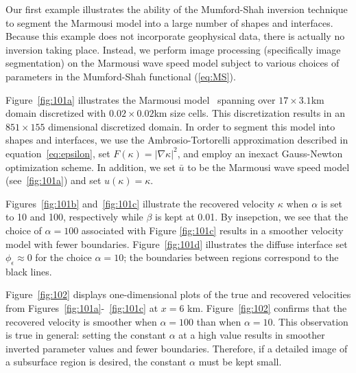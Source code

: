 \documentclass[manuscript,revised]{geophysics}
\begin{document}
Our first example illustrates the ability of the Mumford-Shah inversion technique to segment the Marmousi model into a large number of shapes and interfaces.  Because this example does not incorporate geophysical data, there is actually no inversion taking place.  Instead, we perform image processing (specifically image segmentation) on the Marmousi wave speed model subject to various choices of parameters in the Mumford-Shah functional  (\ref{eq:MS}).

Figure~\ref{fig:101a} illustrates the Marmousi model~\cite{Marmousi2} spanning over $17\times3.1$km domain discretized with $0.02\times0.02$km size cells. This discretization results in an $851\times155$ dimensional discretized domain. In order to segment this model into shapes and interfaces, we use the Ambrosio-Tortorelli approximation described in equation~\ref{eq:epsilon}, set $F(\kappa)=\left\vert \nabla \kappa \right\vert^2$, and employ an inexact Gauss-Newton optimization scheme.  In addition, we set $\bar{u}$ to be the Marmousi wave speed model (see~\ref{fig:101a}) and set $u(\kappa)=\kappa$. 

Figures~\ref{fig:101b} and~\ref{fig:101c} illustrate the recovered velocity $\kappa$ when $\alpha$ is set to 10 and 100, respectively while $\beta$ is kept at 0.01. By insepction, we see that the choice of $\alpha = 100$ associated with Figure \ref{fig:101c} results in a smoother velocity model with fewer boundaries. Figure~\ref{fig:101d} illustrates the diffuse interface set $\phi_\epsilon \approx 0$ for the choice $\alpha = 10$; the boundaries between regions correspond to the black lines.

Figure~\ref{fig:102} displays one-dimensional plots of the true and recovered velocities from Figures~\ref{fig:101a}-~\ref{fig:101c} at $x = 6$ km. Figure~\ref{fig:102} confirms that the recovered velocity is smoother when $\alpha = 100$ than when $\alpha = 10$. This observation is true in general: setting the constant $\alpha$ at a high value results in smoother inverted parameter values and fewer boundaries. Therefore, if a detailed image of a subsurface region is desired, the constant $\alpha$ must be kept small. 
\end{document}
